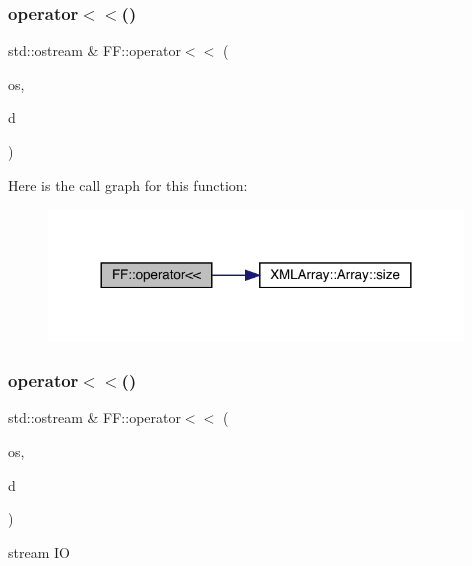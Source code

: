 \subsubsection{\texorpdfstring{operator$<$$<$()}{operator<<()}\hspace{0.1cm}{\footnotesize\ttfamily [1/5]}}
{\footnotesize\ttfamily std\+::ostream \& F\+F\+::operator$<$$<$ (\begin{DoxyParamCaption}\item[{std\+::ostream \&}]{os,  }\item[{const \mbox{\hyperlink{structFF_1_1DiscoKeyOperator__t}{Disco\+Key\+Operator\+\_\+t}} \&}]{d }\end{DoxyParamCaption})}

Here is the call graph for this function\+:\nopagebreak
\begin{figure}[H]
\begin{center}
\leavevmode
\includegraphics[width=312pt]{d5/da6/namespaceFF_ac2ee6d46f8316f1f3631105fbeab604c_cgraph}
\end{center}
\end{figure}
\mbox{\label{namespaceFF_a16521aca33d733f874a91677f71769e5}} 
\subsubsection{\texorpdfstring{operator$<$$<$()}{operator<<()}\hspace{0.1cm}{\footnotesize\ttfamily [2/5]}}
{\footnotesize\ttfamily std\+::ostream \& F\+F\+::operator$<$$<$ (\begin{DoxyParamCaption}\item[{std\+::ostream \&}]{os,  }\item[{const \mbox{\hyperlink{classFF_1_1DiscoValOperator__t}{Disco\+Val\+Operator\+\_\+t}} \&}]{d }\end{DoxyParamCaption})}



stream IO 

\mbox{\label{namespaceFF_afe0b42b2e221ac6c88359573f349a4e7}} 
